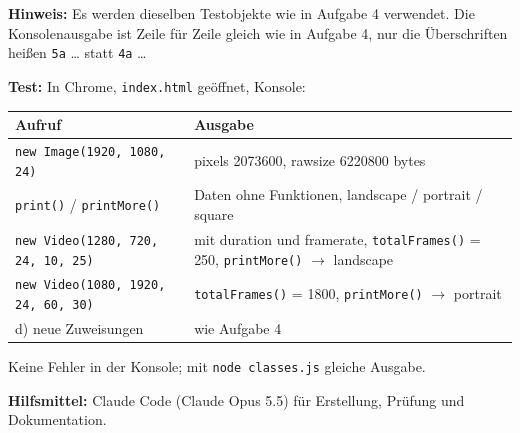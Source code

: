 \documentclass[11pt,a4paper]{article}
\begin{document}
\textbf{Hinweis:} Es werden dieselben Testobjekte wie in Aufgabe 4
verwendet. Die Konsolenausgabe ist Zeile für Zeile gleich wie in
Aufgabe 4, nur die Überschriften heißen \texttt{5a} \dots{} statt
\texttt{4a} \dots

\medskip
\textbf{Test:} In Chrome, \texttt{index.html} geöffnet, Konsole:
\begin{center}
\begin{tabular}{|>{\raggedright\arraybackslash}p{4.6cm}|>{\raggedright\arraybackslash}p{9.1cm}|}
\hline
\textbf{Aufruf} & \textbf{Ausgabe} \\ \hline
\texttt{new Image(1920, 1080, 24)} & pixels 2073600, rawsize 6220800 bytes \\ \hline
\texttt{print()} / \texttt{printMore()} & Daten ohne Funktionen,
  landscape / portrait / square \\ \hline
\texttt{new Video(1280, 720, 24, 10, 25)} & mit duration und framerate,
  \texttt{totalFrames()} = 250, \texttt{printMore()} $\rightarrow$
  landscape \\ \hline
\texttt{new Video(1080, 1920, 24, 60, 30)} & \texttt{totalFrames()} = 1800,
  \texttt{printMore()} $\rightarrow$ portrait \\ \hline
d) neue Zuweisungen & wie Aufgabe 4 \\ \hline
\end{tabular}
\end{center}
Keine Fehler in der Konsole; mit \texttt{node classes.js} gleiche Ausgabe.

\medskip
{\small \textbf{Hilfsmittel:} Claude Code (Claude Opus 5.5) für Erstellung, Prüfung und Dokumentation.}
\end{document}
